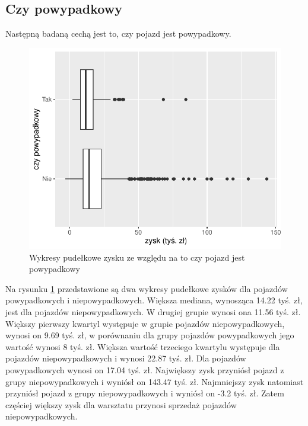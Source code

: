 \documentclass{article}\usepackage[]{graphicx}\usepackage[]{xcolor}
\makeatletter
\def\maxwidth{ %
  \ifdim\Gin@nat@width>\linewidth
    \linewidth
  \else
    \Gin@nat@width
  \fi
}
\newenvironment{knitrout}{}{} %
\makeatother
\begin{document}
\subsection{Czy powypadkowy}

Następną badaną cechą jest to, czy pojazd jest powypadkowy.

\begin{knitrout}
\color{fgcolor}\begin{figure}[H]

{\centering \includegraphics[width=\maxwidth]{figure/fig_wypadkowy-1} 

}

\caption[Wykresy pudełkowe zysku ze względu na to czy pojazd jest powypadkowy]{Wykresy pudełkowe zysku ze względu na to czy pojazd jest powypadkowy}\label{fig:fig_wypadkowy}
\end{figure}

\end{knitrout}

Na rysunku \ref{fig:fig_wypadkowy} przedstawione są dwa wykresy pudełkowe zysków dla pojazdów powypadkowych i niepowypadkowych. Większa mediana, wynosząca 14.22 tyś. zł, jest dla pojazdów niepowypadkowych. W drugiej grupie wynosi ona 11.56 tyś. zł. 
Większy pierwszy kwartyl występuje w grupie pojazdów niepowypadkowych, wynosi on 9.69 tyś. zł, w porównaniu dla grupy pojazdów powypadkowych jego wartość wynosi 8 tyś. zł.
Większa wartość trzeciego kwartylu występuje dla pojazdów niepowypadkowych i wynosi 22.87 tyś. zł. Dla pojazdów powypadkowych wynosi on 17.04 tyś. zł.
Największy zysk przyniósł pojazd z grupy niepowypadkowych i wyniósł on 143.47 tyś. zł. 
Najmniejszy zysk natomiast przyniósł pojazd z grupy niepowypadkowych i wyniósł on -3.2 tyś. zł. Zatem częściej większy zysk dla warsztatu przynosi sprzedaż pojazdów niepowypadkowych. 
\end{document}
